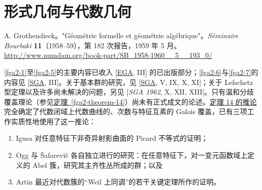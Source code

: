 \part{形式几何与代数几何}\label{fga2}\thispagestyle{fancy}
\begin{original}{}\label{fga2-original-citation}\skipsinglepar
\par{}A. Grothendieck。"Géométrie formelle et géométrie algébrique"。\emph{Séminaire Bourbaki} \textbf{11}（1958–59），第 182 次报告，1959 年 5 月。\url{http://www.numdam.org/book-part/SB_1958-1960__5__193_0/}\end{original}
\par{}\cref{fga2-1}至\cref{fga2-5}的主要内容已收入 [\hyperref[GD1960]{EGA}, III] 的已出版部分；\cref{fga2-6}与\cref{fga2-7}的内容见 [\hyperref[Gro1960b]{SGA}, III]。关于基本群的研究，见 [\hyperref[Gro1960b]{SGA}, V, IX, X, XI]；关于 Lefschetz 型定理以及许多尚未解决的问题，另见 [\emph{SGA 1962}, X, XII, XIII]。只有温和分歧覆盖理论（参见\hyperref[fga2-theorem-14]{定理~\ref*{fga2-theorem-14}}）尚未有正式成文的论述。\hyperref[fga2-theorem-14-corollary-1]{定理 14 的推论}完全确定了代数闭域上代数曲线的、次数与特征互素的 Galois 覆盖，已有三项工作实质性地使用了这一推论：
\begin{enumerate}\item{}Igusa 对任意特征下非奇异射影曲面的 Picard 不等式的证明；

    \item{}Ogg 与 Šafarevič 各自独立进行的研究：在任意特征下，对一变元函数域上定义的 Abel 簇，研究其主齐性丛所成的群；以及

    \item{}Artin 最近对代数簇的“Weil 上同调”的若干关键定理所作的证明。\end{enumerate}
